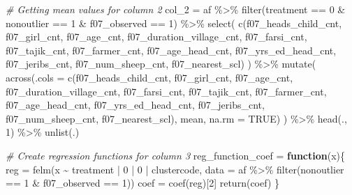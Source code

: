 \documentclass[
]{article}
\newenvironment{Shaded}{\begin{snugshade}}{\end{snugshade}}
\newcommand{\AttributeTok}[1]{\textcolor[rgb]{0.77,0.63,0.00}{#1}}
\newcommand{\CommentTok}[1]{\textcolor[rgb]{0.56,0.35,0.01}{\textit{#1}}}
\newcommand{\ConstantTok}[1]{\textcolor[rgb]{0.00,0.00,0.00}{#1}}
\newcommand{\ControlFlowTok}[1]{\textcolor[rgb]{0.13,0.29,0.53}{\textbf{#1}}}
\newcommand{\DecValTok}[1]{\textcolor[rgb]{0.00,0.00,0.81}{#1}}
\newcommand{\FunctionTok}[1]{\textcolor[rgb]{0.00,0.00,0.00}{#1}}
\newcommand{\NormalTok}[1]{#1}
\newcommand{\OtherTok}[1]{\textcolor[rgb]{0.56,0.35,0.01}{#1}}
\newcommand{\SpecialCharTok}[1]{\textcolor[rgb]{0.00,0.00,0.00}{#1}}
\begin{document}
\begin{Shaded}
\begin{Highlighting}[]
\CommentTok{\# Getting mean values for column 2}
\NormalTok{col\_2 }\OtherTok{=}\NormalTok{ af }\SpecialCharTok{\%\textgreater{}\%} 
  \FunctionTok{filter}\NormalTok{(treatment }\SpecialCharTok{==} \DecValTok{0} \SpecialCharTok{\&}\NormalTok{ nonoutlier }\SpecialCharTok{==} \DecValTok{1} \SpecialCharTok{\&}\NormalTok{ f07\_observed }\SpecialCharTok{==} \DecValTok{1}\NormalTok{) }\SpecialCharTok{\%\textgreater{}\%} 
  \FunctionTok{select}\NormalTok{(}
    \FunctionTok{c}\NormalTok{(f07\_heads\_child\_cnt, f07\_girl\_cnt, f07\_age\_cnt, f07\_duration\_village\_cnt,}
\NormalTok{                   f07\_farsi\_cnt,  f07\_tajik\_cnt,  f07\_farmer\_cnt, }
\NormalTok{                   f07\_age\_head\_cnt, f07\_yrs\_ed\_head\_cnt, f07\_jeribs\_cnt, }
\NormalTok{                   f07\_num\_sheep\_cnt, f07\_nearest\_scl)}
\NormalTok{  ) }\SpecialCharTok{\%\textgreater{}\%} 
  \FunctionTok{mutate}\NormalTok{(}
  \FunctionTok{across}\NormalTok{(}\AttributeTok{.cols =} \FunctionTok{c}\NormalTok{(f07\_heads\_child\_cnt, f07\_girl\_cnt, f07\_age\_cnt, f07\_duration\_village\_cnt,}
\NormalTok{                   f07\_farsi\_cnt,  f07\_tajik\_cnt,  f07\_farmer\_cnt, }
\NormalTok{                   f07\_age\_head\_cnt, f07\_yrs\_ed\_head\_cnt, f07\_jeribs\_cnt, }
\NormalTok{                   f07\_num\_sheep\_cnt, f07\_nearest\_scl), mean, }\AttributeTok{na.rm =} \ConstantTok{TRUE}\NormalTok{)}
\NormalTok{  ) }\SpecialCharTok{\%\textgreater{}\%} \FunctionTok{head}\NormalTok{(., }\DecValTok{1}\NormalTok{) }\SpecialCharTok{\%\textgreater{}\%} \FunctionTok{unlist}\NormalTok{(.)}



\CommentTok{\# Create regression functions for column 3}
\NormalTok{reg\_function\_coef }\OtherTok{=} \ControlFlowTok{function}\NormalTok{(x)\{}
\NormalTok{    reg }\OtherTok{=} \FunctionTok{felm}\NormalTok{(x }\SpecialCharTok{\textasciitilde{}}\NormalTok{ treatment }\SpecialCharTok{|} \DecValTok{0} \SpecialCharTok{|} \DecValTok{0} \SpecialCharTok{|}\NormalTok{ clustercode, }
               \AttributeTok{data =}\NormalTok{ af }\SpecialCharTok{\%\textgreater{}\%} \FunctionTok{filter}\NormalTok{(nonoutlier }\SpecialCharTok{==} \DecValTok{1} \SpecialCharTok{\&}\NormalTok{ f07\_observed }\SpecialCharTok{==} \DecValTok{1}\NormalTok{))}
\NormalTok{    coef }\OtherTok{=} \FunctionTok{coef}\NormalTok{(reg)[}\DecValTok{2}\NormalTok{]}
    \FunctionTok{return}\NormalTok{(coef)}
\NormalTok{\}}



\end{Highlighting}
\end{Shaded}
\end{document}

